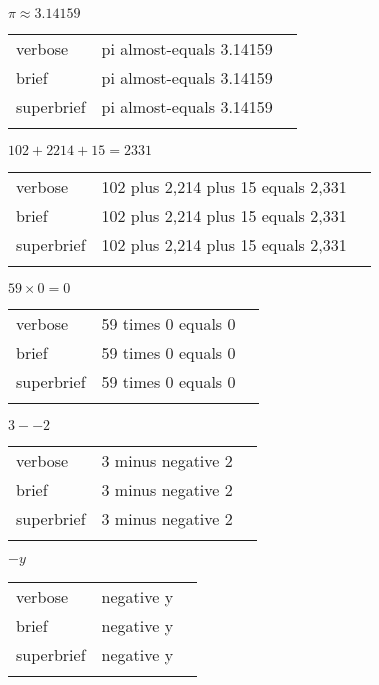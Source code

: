 \label{sec:numbers}

\R
\E $\pi \approx 3.14159$
\begin{longtable}[c]{@{}lll@{}}
\toprule\addlinespace
verbose & pi almost-equals 3.14159 &

\\\addlinespace
brief & pi almost-equals 3.14159 &

\\\addlinespace
superbrief & pi almost-equals 3.14159 &

\\\addlinespace
\bottomrule
\end{longtable}


\E $102 + 2214 + 15 = 2331$
\begin{longtable}[c]{@{}lll@{}}
\toprule\addlinespace
verbose & 102 plus 2,214 plus 15 equals 2,331 &

\\\addlinespace
brief & 102 plus 2,214 plus 15 equals 2,331 &

\\\addlinespace
superbrief & 102 plus 2,214 plus 15 equals 2,331 &

\\\addlinespace
\bottomrule
\end{longtable}


\E $59 \times 0 = 0$
\begin{longtable}[c]{@{}lll@{}}
\toprule\addlinespace
verbose & 59 times 0 equals 0 &

\\\addlinespace
brief & 59 times 0 equals 0 &

\\\addlinespace
superbrief & 59 times 0 equals 0 &

\\\addlinespace
\bottomrule
\end{longtable}


\R
\E $3 - -2$
\begin{longtable}[c]{@{}lll@{}}
\toprule\addlinespace
verbose & 3 minus negative 2 &

\\\addlinespace
brief & 3 minus negative 2 &

\\\addlinespace
superbrief & 3 minus negative 2 &

\\\addlinespace
\bottomrule
\end{longtable}


\E $-y$
\begin{longtable}[c]{@{}lll@{}}
\toprule\addlinespace
verbose & negative y &

\\\addlinespace
brief & negative y &

\\\addlinespace
superbrief & negative y &

\\\addlinespace
\bottomrule
\end{longtable}


